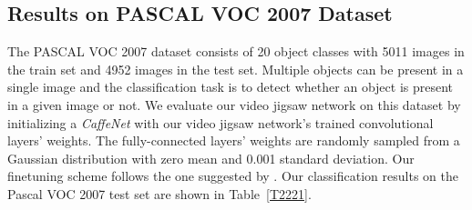 \documentclass[10pt,twocolumn,letterpaper]{article}
\begin{document}
\begin{table}[ht!]
\centering
{}
\caption{PASCAL VOC 2007 classification results compared with other methods. Other results taken from \cite{noroozi2017representation} and \cite{lee2017unsupervised}}
\label{T2221}

\end{table}

\subsection{Results on PASCAL VOC 2007 Dataset}
The PASCAL VOC 2007 dataset consists of 20 object classes with 5011 images in the train set and 4952 images in the test set. Multiple objects can be present in a single image and the classification task is to detect whether an object is present in a given image or not. We evaluate our video jigsaw network on this dataset by initializing a \textit{CaffeNet} with our video jigsaw network's trained convolutional layers' weights. The fully-connected layers' weights are randomly sampled from a Gaussian distribution with zero mean and 0.001 standard deviation. Our finetuning scheme follows the one suggested by \cite{krahenbuhl2015data}. Our classification results on the Pascal VOC 2007 test set are shown in Table~\ref{T2221}.
\end{document}
